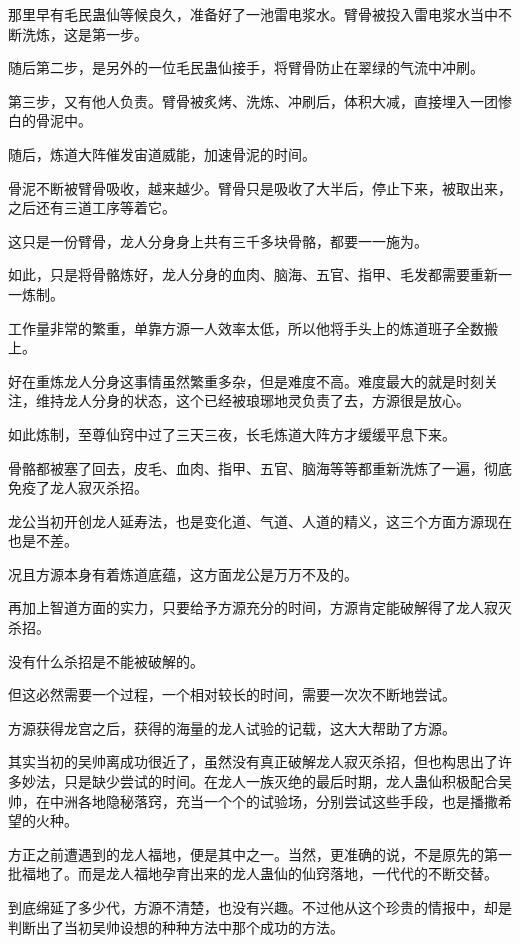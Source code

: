 \begin{this_body}
那里早有毛民蛊仙等候良久，准备好了一池雷电浆水。臂骨被投入雷电浆水当中不断洗炼，这是第一步。

随后第二步，是另外的一位毛民蛊仙接手，将臂骨防止在翠绿的气流中冲刷。

第三步，又有他人负责。臂骨被炙烤、洗炼、冲刷后，体积大减，直接埋入一团惨白的骨泥中。

随后，炼道大阵催发宙道威能，加速骨泥的时间。

骨泥不断被臂骨吸收，越来越少。臂骨只是吸收了大半后，停止下来，被取出来，之后还有三道工序等着它。

这只是一份臂骨，龙人分身身上共有三千多块骨骼，都要一一施为。

如此，只是将骨骼炼好，龙人分身的血肉、脑海、五官、指甲、毛发都需要重新一一炼制。

工作量非常的繁重，单靠方源一人效率太低，所以他将手头上的炼道班子全数搬上。

好在重炼龙人分身这事情虽然繁重多杂，但是难度不高。难度最大的就是时刻关注，维持龙人分身的状态，这个已经被琅琊地灵负责了去，方源很是放心。

如此炼制，至尊仙窍中过了三天三夜，长毛炼道大阵方才缓缓平息下来。

骨骼都被塞了回去，皮毛、血肉、指甲、五官、脑海等等都重新洗炼了一遍，彻底免疫了龙人寂灭杀招。

龙公当初开创龙人延寿法，也是变化道、气道、人道的精义，这三个方面方源现在也是不差。

况且方源本身有着炼道底蕴，这方面龙公是万万不及的。

再加上智道方面的实力，只要给予方源充分的时间，方源肯定能破解得了龙人寂灭杀招。

没有什么杀招是不能被破解的。

但这必然需要一个过程，一个相对较长的时间，需要一次次不断地尝试。

方源获得龙宫之后，获得的海量的龙人试验的记载，这大大帮助了方源。

其实当初的吴帅离成功很近了，虽然没有真正破解龙人寂灭杀招，但也构思出了许多妙法，只是缺少尝试的时间。在龙人一族灭绝的最后时期，龙人蛊仙积极配合吴帅，在中洲各地隐秘落窍，充当一个个的试验场，分别尝试这些手段，也是播撒希望的火种。

方正之前遭遇到的龙人福地，便是其中之一。当然，更准确的说，不是原先的第一批福地了。而是龙人福地孕育出来的龙人蛊仙的仙窍落地，一代代的不断交替。

到底绵延了多少代，方源不清楚，也没有兴趣。不过他从这个珍贵的情报中，却是判断出了当初吴帅设想的种种方法中那个成功的方法。


\end{this_body}
